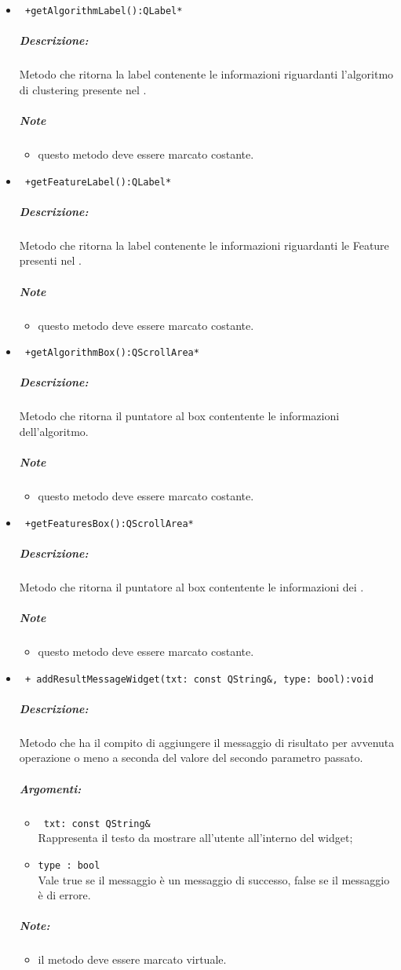 \begin{itemize}
\item\color{blue}\verb! +getAlgorithmLabel():QLabel*!
\color{black}
\subparagraph{Descrizione:}Metodo che ritorna la label contenente le informazioni riguardanti l'algoritmo di clustering\g{} presente nel \protocol{}.
 \subparagraph{Note}
 \begin{itemize}
 \item questo metodo deve essere marcato costante.
 \end{itemize}

\item\color{blue}\verb! +getFeatureLabel():QLabel*!
\color{black}
\subparagraph{Descrizione:}Metodo che ritorna la label contenente le informazioni riguardanti le Feature\g{} presenti nel \protocol{}.
 \subparagraph{Note}
 \begin{itemize}
 \item questo metodo deve essere marcato costante.
 \end{itemize}

\item\color{blue}\verb! +getAlgorithmBox():QScrollArea*!
\color{black}
\subparagraph{Descrizione:}Metodo che ritorna il puntatore al box contentente le informazioni dell'algoritmo.
 \subparagraph{Note}
 \begin{itemize}
 \item questo metodo deve essere marcato costante.
 \end{itemize}
 
\item\color{blue}\verb! +getFeaturesBox():QScrollArea*!
\color{black}
\subparagraph{Descrizione:}Metodo che ritorna il puntatore al box contentente le informazioni dei \protocol{}.
 \subparagraph{Note}
 \begin{itemize}
 \item questo metodo deve essere marcato costante.
 \end{itemize} 
 
\item \color{blue} \verb! + addResultMessageWidget(txt: const QString&, type: bool):void! 
\color{black}
\subparagraph{Descrizione:} Metodo che ha il compito di aggiungere il messaggio di risultato per avvenuta operazione o meno a seconda del valore del secondo parametro passato.
\subparagraph{Argomenti:}
\begin{itemize}
\item \color{RoyalPurple} \verb! txt: const QString& !  \\Rappresenta il testo da mostrare all'utente all'interno del widget;
\item \color{RoyalPurple} \verb!type : bool ! \\ Vale true se il messaggio è un messaggio di successo, false se il messaggio è di errore.
\end{itemize}
\subparagraph{Note:}
\begin{itemize}
\item il metodo deve essere marcato virtuale.
\end{itemize}


\end{itemize}
